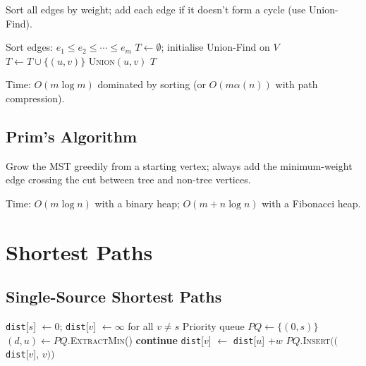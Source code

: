 \documentclass[oneside]{book}
\begin{document}
Sort all edges by weight; add each edge if it doesn't form a cycle (use Union-Find).

\begin{algorithm}[H]
\caption{Kruskal's MST}
\begin{algorithmic}[1]
\State Sort edges: $e_1 \leq e_2 \leq \cdots \leq e_m$
\State $T \gets \emptyset$; initialise Union-Find on $V$
        \State $T \gets T \cup \{(u,v)\}$
        \State \textsc{Union}$(u, v)$
    \EndIf
\EndFor
\State \Return $T$
\end{algorithmic}
\end{algorithm}

Time: $O(m \log m)$ dominated by sorting (or $O(m \alpha(n))$ with path compression).

\subsection*{Prim's Algorithm}

Grow the MST greedily from a starting vertex; always add the minimum-weight
edge crossing the cut between tree and non-tree vertices.

Time: $O(m \log n)$ with a binary heap; $O(m + n \log n)$ with a Fibonacci heap.

\section{Shortest Paths}

\subsection*{Single-Source Shortest Paths}


\begin{algorithm}[H]
\caption{Dijkstra's Algorithm}
\begin{algorithmic}[1]
\State \texttt{dist}[$s$] $\gets 0$; \texttt{dist}[$v$] $\gets \infty$ for all $v \neq s$
\State Priority queue $PQ \gets \{(0, s)\}$
    \State $(d, u) \gets PQ$.\textsc{ExtractMin}()
     \textbf{continue} \EndIf
            \State \texttt{dist}[$v$] $\gets$ \texttt{dist}[$u$] $+ w$
            \State $PQ$.\textsc{Insert}$(($ \texttt{dist}[$v$], $v))$
        \EndIf
    \EndFor
\EndWhile
\end{algorithmic}
\end{algorithm}
\end{document}
